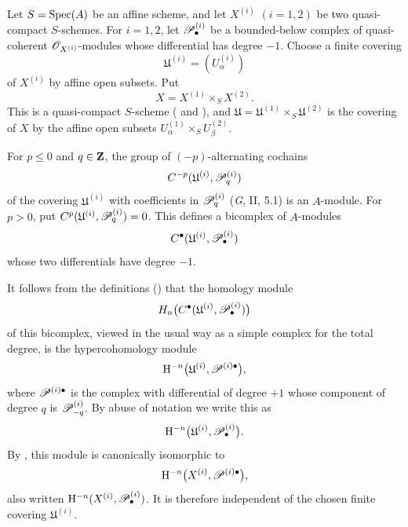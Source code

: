 \begin{env}[6.6.1]
\label{III.6.6.1}
Let $S=\operatorname{Spec}(A)$ be an affine scheme, and let $X^{(i)}$
$(i=1,2)$ be two quasi-compact $S$-schemes.  For $i=1,2$, let
$\mathscr{P}_\bullet^{(i)}$ be a bounded-below complex of
quasi-coherent $\mathscr{O}_{X^{(i)}}$-modules whose differential has
degree $-1$.  Choose a finite covering
\[
  \mathfrak U^{(i)}=(U_\alpha^{(i)})
\]
of $X^{(i)}$ by affine open subsets.  Put
\[
  X=X^{(1)}\times_SX^{(2)}.
\]
This is a quasi-compact $S$-scheme
( and ), and
$\mathfrak U=\mathfrak U^{(1)}\times_S\mathfrak U^{(2)}$ is the
covering of $X$ by the affine open subsets
$U_\alpha^{(1)}\times_SU_\beta^{(2)}$.

For $p\leq0$ and $q\in\mathbf{Z}$, the group of $(-p)$-alternating
cochains
\[
  C^{-p}(\mathfrak U^{(i)},\mathscr{P}_q^{(i)})
\]
of the covering $\mathfrak U^{(i)}$ with coefficients in
$\mathscr{P}_q^{(i)}$ (\emph{G}, II, 5.1) is an $A$-module.  For
$p>0$, put
$C^p(\mathfrak U^{(i)},\mathscr{P}_q^{(i)})=0$.  This defines a
bicomplex of $A$-modules
\[
  C^\bullet(\mathfrak U^{(i)},\mathscr{P}_\bullet^{(i)})
\]
whose two differentials have degree $-1$.

It follows from the definitions () that the
homology module
\[
  H_n\bigl(C^\bullet
    (\mathfrak U^{(i)},\mathscr{P}_\bullet^{(i)})\bigr)
\]
of this bicomplex, viewed in the usual way as a simple complex
for the total degree, is the hypercohomology module
\[
  \mathrm{H}^{-n}
  \bigl(\mathfrak U^{(i)},\mathscr{P}^{(i)\bullet}\bigr),
\]
where $\mathscr{P}^{(i)\bullet}$ is the complex with differential of
degree $+1$ whose component of degree $q$ is
$\mathscr{P}_{-q}^{(i)}$.  By abuse of notation we write this as
\[
  \mathrm{H}^{-n}
  \bigl(\mathfrak U^{(i)},\mathscr{P}_\bullet^{(i)}\bigr).
\]
By , this module is canonically isomorphic to
\[
  \mathrm{H}^{-n}\bigl(X^{(i)},\mathscr{P}^{(i)\bullet}\bigr),
\]
also written
$\mathrm{H}^{-n}(X^{(i)},\mathscr{P}_\bullet^{(i)})$.  It is therefore
independent of the chosen finite covering
$\mathfrak U^{(i)}$.
\end{env}

